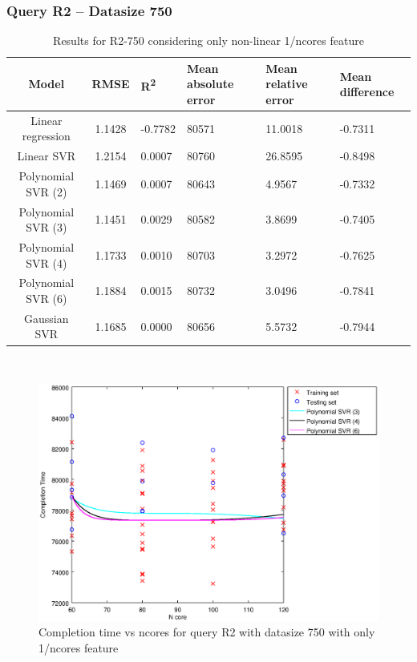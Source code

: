\documentclass[a4paper,11pt]{article}
\begin{document}
\newpage
\subsubsection{Query R2 -- Datasize 750}
\begin{table}[H]
	\centering
	\begin{adjustbox}{center}
		\begin{tabular}{c | c M{1.2cm} M{2.5cm} M{2.5cm} M{1.8cm}}
			Model & RMSE & R\textsuperscript{2} & Mean absolute error & Mean relative error & Mean difference \tabularnewline
			\hline
			Linear regression & 1.1428 & -0.7782 &  80571 & 11.0018 & -0.7311 \\
			Linear SVR & 1.2154 & 0.0007 &  80760 & 26.8595 & -0.8498 \\
			Polynomial SVR (2) & 1.1469 & 0.0007 &  80643 & 4.9567 & -0.7332 \\
			Polynomial SVR (3) & 1.1451 & 0.0029 &  80582 & 3.8699 & -0.7405 \\
			Polynomial SVR (4) & 1.1733 & 0.0010 &  80703 & 3.2972 & -0.7625 \\
			Polynomial SVR (6) & 1.1884 & 0.0015 &  80732 & 3.0496 & -0.7841 \\
			Gaussian SVR & 1.1685 & 0.0000 &  80656 & 5.5732 & -0.7944 \\
		\end{tabular}
	\end{adjustbox}
	\\
	\caption{Results for R2-750 considering only non-linear 1/ncores feature}
	\label{table_R2_prediction_all}
\end{table}

\begin {figure}[hbtp]
\centering
\includegraphics[width=\textwidth]{output/R2_750_ONLY_1_OVER_NCORES/plot_R2_750_bestmodels.eps}
\caption {Completion time vs ncores for query R2 with datasize 750 with only 1/ncores feature}
\end {figure}
\end{document}
